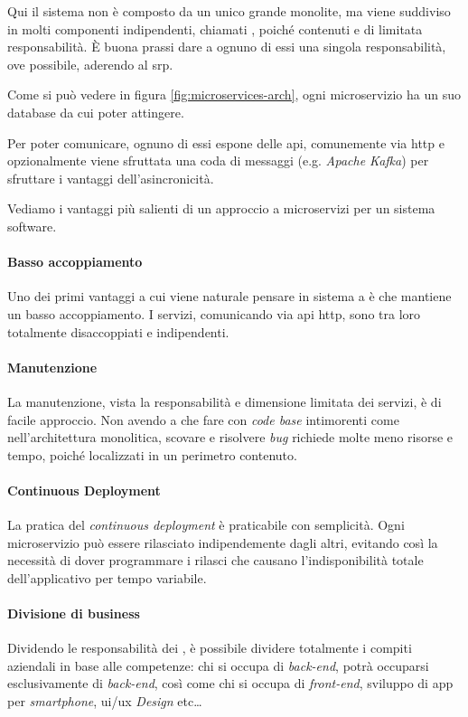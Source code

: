 Qui il sistema non è composto da un unico grande monolite, ma viene suddiviso in molti componenti indipendenti, chiamati , poiché contenuti e di limitata responsabilità.
È buona prassi dare a ognuno di essi una singola responsabilità, ove possibile, aderendo al \gls{srp}\gloss.

Come si può vedere in figura \ref{fig:microservices-arch}, ogni \gls{microservizio} ha un suo database da cui poter attingere.

Per poter comunicare, ognuno di essi espone delle \gls{api}, comunemente via \acrshort{http} e opzionalmente viene sfruttata una coda di messaggi (e.g. \textit{Apache Kafka}) per sfruttare i vantaggi dell'asincronicità.

\medskip

Vediamo i vantaggi più salienti di un approccio a microservizi per un sistema software.

\paragraph*{Basso accoppiamento} Uno dei primi vantaggi a cui viene naturale pensare in sistema a  è che mantiene un basso accoppiamento. I servizi, comunicando via \gls{api} \acrshort{http}, sono tra loro totalmente disaccoppiati e indipendenti.

\paragraph*{Manutenzione} La manutenzione, vista la responsabilità e dimensione limitata dei servizi, è di facile approccio.
Non avendo a che fare con \textit{code base} intimorenti come nell'architettura monolitica, scovare e risolvere \textit{bug} richiede
molte meno risorse e tempo, poiché localizzati in un perimetro contenuto.

\paragraph*{Continuous Deployment} La pratica del \textit{continuous deployment} è praticabile con semplicità.
Ogni microservizio può essere rilasciato indipendemente dagli altri,
evitando così la necessità di dover programmare i rilasci che causano l'indisponibilità totale
dell'applicativo per tempo variabile.

\paragraph*{Divisione di business} Dividendo le responsabilità dei , è possibile dividere totalmente i compiti aziendali in base alle
competenze: chi si occupa di \textit{back-end}, potrà occuparsi esclusivamente di
\textit{back-end}, così come chi si occupa di \textit{front-end}, sviluppo di app per \textit{smartphone}, \gls{ui}/\acrshort{ux} \textit{Design} etc\dots

